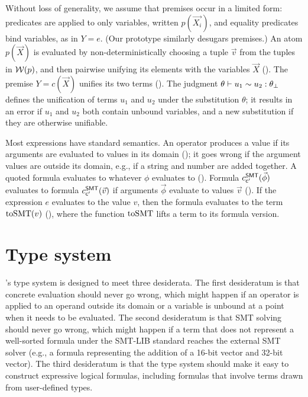\documentclass[acmsmall,screen,nonacm]{acmart}
\theoremstyle{definition}
\begin{document}
Without loss of generality, we assume that premises occur in a limited form:
predicates are applied to only variables, written $p(\vec{X_i})$, and
equality predicates bind variables, as in $Y = e$.
(Our prototype similarly desugars premises.)
An atom $p(\vec{X})$ is evaluated by non-deterministically choosing a tuple
$\vec{v}$ from the tuples in $\mathcal{W}(p)$, and then pairwise unifying its
elements with the variables $\vec{X}$ ().
The premise $Y = c(\vec{X})$ unifies its two terms ().
The judgment $\theta \vdash u_1 \sim u_2 : \theta_\bot$ defines the
unification of terms $u_1$ and $u_2$ under the substitution $\theta$; it
results in an error if $u_1$ and $u_2$ both contain unbound variables, and a
new substitution if they are otherwise unifiable.

Most expressions have standard semantics.
An operator produces a value if its arguments are evaluated
to values in its domain (); it goes wrong if the argument
values are outside its domain, e.g., if a string and number are added together.
A quoted formula \qq{\phi} evaluates to whatever $\phi$ evaluates to
().
Formula $c^\mathsf{SMT}_{\mathsf{c'}}(\vec{\phi})$ evaluates to formula $c^\mathsf{SMT}_{\mathsf{c'}}(\vec{v})$ if
arguments $\vec{\phi}$ evaluate to values $\vec{v}$ ().
If the expression $e$ evaluates to the value $v$, then the formula 
evaluates to the term $\mathrm{toSMT}(v)$ (), where the
function $\mathrm{toSMT}$ lifts a term to its formula version.

\section{Type system}\label{sec:typesystem}

\Name's type system is designed to meet three desiderata.
The first desideratum is that concrete evaluation should never go wrong, which
might happen if an operator is applied to an
operand outside its domain or a variable is unbound at a point when it needs to
be evaluated.
The second desideratum is that SMT solving should never go wrong, which might
happen if a term that does not represent a well-sorted formula under the
SMT-LIB standard reaches the external SMT solver (e.g., a formula representing
the addition of a 16-bit vector and 32-bit vector).
The third desideratum is that the type system should make it easy to construct
expressive logical formulas, including formulas that involve terms drawn from
user-defined types.
\end{document}
